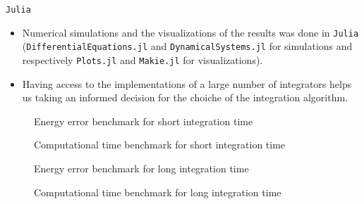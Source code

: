 \documentclass{beamer}
\begin{document}

\begin{frame}{\texttt{Julia}}
	\begin{itemize}
		\item Numerical simulations and the visualizations of the
		results was done in \texttt{Julia} \cite{Julia-2017} (\texttt{DifferentialEquations.jl} \cite{DifferentialEquations.jl-2017}
		and \texttt{DynamicalSystems.jl} \cite{DynamicalSystems.jl-2018} for simulations and respectively
		\texttt{Plots.jl} and \texttt{Makie.jl} for visualizations).
		\item Having access to the implementations of a large
		number of integrators helps us taking an informed decision
		for the choiche of the integration algorithm.
	\end{itemize}
\end{frame}


\begin{frame}
	\begin{figure}
		
		\caption{Energy error benchmark for short integration time}
	\end{figure}
\end{frame}


\begin{frame}
	\begin{figure}
		
		\caption{Computational time benchmark for short integration time}
	\end{figure}
\end{frame}


\begin{frame}
	\begin{figure}
		
		\caption{Energy error benchmark for long integration time}
	\end{figure}
\end{frame}


\begin{frame}
	\begin{figure}
		
		\caption{Computational time benchmark for long integration time}
	\end{figure}
\end{frame}
\end{document}
